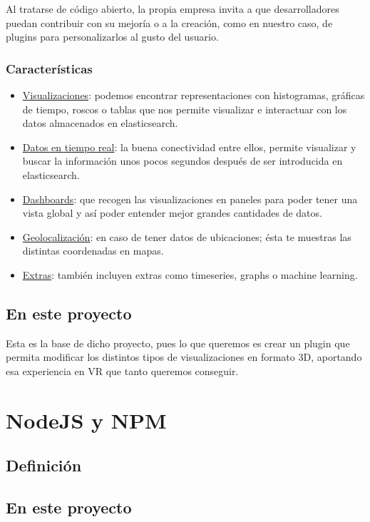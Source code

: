 \documentclass[a4paper, 12pt]{book}
\begin{document}
Al tratarse de c\'odigo abierto, la propia empresa invita a que desarrolladores puedan contribuir con su mejor\'ia o a la creaci\'on, como en nuestro caso, de plugins para personalizarlos al gusto del usuario. 
\subsubsection{Caracter\'isticas}
\begin{itemize}
\item \underline{Visualizaciones}: podemos encontrar representaciones con histogramas, gr\'aficas de tiempo, roscos o tablas que nos permite visualizar e interactuar con los datos almacenados en elasticsearch.
\item \underline{Datos en tiempo real}: la buena conectividad entre ellos, permite visualizar y buscar la informaci\'on unos pocos segundos despu\'es de ser introducida en elasticsearch.
\item \underline{Dashboards}: que recogen las visualizaciones en paneles para poder tener una vista global y as\'i poder entender mejor grandes cantidades de datos.
\item \underline{Geolocalizaci\'on}: en caso de tener datos de ubicaciones; \'esta te muestras las distintas coordenadas en mapas.
\item \underline{Extras}: tambi\'en incluyen extras como timeseries, graphs o machine learning.
\end{itemize}
\subsection{En este proyecto}
Esta es la base de dicho proyecto, pues lo que queremos es crear un plugin que permita modificar los distintos tipos de visualizaciones en formato 3D, aportando esa experiencia en VR que tanto queremos conseguir.



\section{NodeJS y NPM}
\label{sec:nodejs}
\subsection{Definici\'on}
\subsection{En este proyecto}
\end{document}
